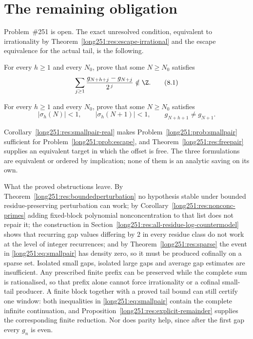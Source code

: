 \section{The remaining obligation}\label{long251:sec:open}

Problem~\#251 is open.  The exact unresolved condition, equivalent to
irrationality by Theorem~\ref{long251:res:escape-irrational} and the escape
equivalence for the actual tail, is the following.

\begin{problem}\label{long251:prob:escape}
For every $h\ge1$ and every $N_0$, prove that some $N\ge N_0$ satisfies
\[
 \sum_{j\ge1}\frac{g_{N+h+j}-g_{N+j}}{2^{\,j}}\notin\Z .
\tag{8.1}\label{long251:eq:shift-escape}
\]
\end{problem}

\begin{problem}\label{long251:prob:smallpair}
For every $h\ge1$ and every $N_0$, prove that some $N\ge N_0$ satisfies
\[
 \bigl|\sigma_h(N)\bigr|<1,\qquad
 \bigl|\sigma_h(N+1)\bigr|<1,\qquad
 g_{N+h+1}\ne g_{N+1} .
\tag{8.2}\label{long251:eq:smallpair}
\]
\end{problem}

Corollary~\ref{long251:res:smallpair-real} makes Problem~\ref{long251:prob:smallpair}
sufficient for Problem~\ref{long251:prob:escape}, and Theorem~\ref{long251:res:freepair}
supplies an equivalent target in which the offset is free.  The three
formulations are equivalent or ordered by implication;
none of them is an analytic saving on its own.

What the proved obstructions leave.  By Theorem~\ref{long251:res:boundedperturbation}
no hypothesis stable under bounded residue-preserving perturbation can work;
by Corollary~\ref{long251:res:nonconc-primes} adding fixed-block polynomial
nonconcentration to that list does not repair it; the construction in
Section~\ref{long251:res:all-residue-log-countermodel} shows that recurring gap
values differing by $2$ in every residue class do not work at the level of
integer recurrences; and by
Theorem~\ref{long251:res:sparse} the event in \eqref{long251:eq:smallpair} has density zero, so
it must be produced cofinally on a sparse set.  Isolated small gaps, isolated
large gaps and average gap estimates are insufficient.  Any prescribed finite
prefix can be preserved while the complete sum is rationalised, so that prefix
alone cannot force irrationality or a cofinal small-tail producer.  A finite
block together with a proved tail bound can still certify one window: both
inequalities in \eqref{long251:eq:smallpair} contain the complete infinite
continuation, and Proposition~\ref{long251:res:explicit-remainder} supplies the
corresponding finite reduction.  Nor does
parity help, since after the first gap every $g_n$ is even.

